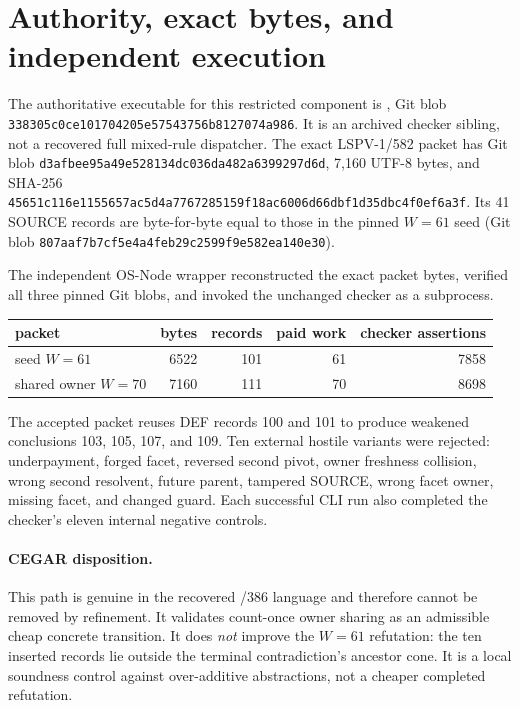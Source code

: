 \documentclass[11pt]{article}
\begin{document}
\section{Authority, exact bytes, and independent execution}
The authoritative executable for this restricted component is
, Git blob
\texttt{338305c0ce101704205e57543756b8127074a986}.  It is an archived
checker sibling, not a recovered full mixed-rule dispatcher.  The exact
LSPV-1/582 packet has Git blob
\texttt{d3afbee95a49e528134dc036da482a6399297d6d}, 7,160 UTF-8 bytes,
and SHA-256
\texttt{45651c116e1155657ac5d4a7767285159f18ac6006d66dbf1d35dbc4f0ef6a3f}.
Its 41 SOURCE records are byte-for-byte equal to those in the pinned
\(W=61\) seed (Git blob
\texttt{807aaf7b7cf5e4a4feb29c2599f9e582ea140e30}).

The independent OS-Node wrapper reconstructed the exact packet bytes, verified
all three pinned Git blobs, and invoked the unchanged checker as a subprocess.
\begin{center}
\begin{tabular}{lrrrr}
\toprule
packet & bytes & records & paid work & checker assertions\\
\midrule
seed \(W=61\) & 6522 & 101 & 61 & 7858\\
shared owner \(W=70\) & 7160 & 111 & 70 & 8698\\
\bottomrule
\end{tabular}
\end{center}
The accepted packet reuses DEF records 100 and 101 to produce weakened
conclusions 103, 105, 107, and 109.  Ten external hostile variants were
rejected: underpayment, forged facet, reversed second pivot, owner freshness
collision, wrong second resolvent, future parent, tampered SOURCE, wrong
facet owner, missing facet, and changed guard.  Each successful CLI run also
completed the checker's eleven internal negative controls.

\paragraph{CEGAR disposition.}
This path is genuine in the recovered /386 language and therefore cannot be
removed by refinement.  It validates count-once owner sharing as an admissible
cheap concrete transition.  It does \emph{not} improve the \(W=61\)
refutation: the ten inserted records lie outside the terminal
contradiction's ancestor cone.  It is a local soundness control against
over-additive abstractions, not a cheaper completed refutation.
\end{document}
